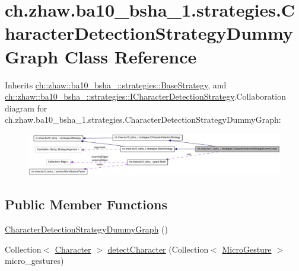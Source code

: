 \hypertarget{classch_1_1zhaw_1_1ba10__bsha__1_1_1strategies_1_1CharacterDetectionStrategyDummyGraph}{
\section{ch.zhaw.ba10\_\-bsha\_\-1.strategies.CharacterDetectionStrategyDummyGraph Class Reference}
\label{classch_1_1zhaw_1_1ba10__bsha__1_1_1strategies_1_1CharacterDetectionStrategyDummyGraph}
}


Inherits \hyperlink{classch_1_1zhaw_1_1ba10__bsha__1_1_1strategies_1_1BaseStrategy}{ch::zhaw::ba10\_\-bsha\_::strategies::BaseStrategy}, and \hyperlink{interfacech_1_1zhaw_1_1ba10__bsha__1_1_1strategies_1_1ICharacterDetectionStrategy}{ch::zhaw::ba10\_\-bsha\_::strategies::ICharacterDetectionStrategy}.Collaboration diagram for ch.zhaw.ba10\_\-bsha\_\-1.strategies.CharacterDetectionStrategyDummyGraph:\nopagebreak
\begin{figure}[H]
\begin{center}
\leavevmode
\includegraphics[width=400pt]{classch_1_1zhaw_1_1ba10__bsha__1_1_1strategies_1_1CharacterDetectionStrategyDummyGraph__coll__graph}
\end{center}
\end{figure}
\subsection*{Public Member Functions}
\begin{DoxyCompactItemize}
\item 
\hyperlink{classch_1_1zhaw_1_1ba10__bsha__1_1_1strategies_1_1CharacterDetectionStrategyDummyGraph_ac895001a14e7fe390464f49a94ddd340}{CharacterDetectionStrategyDummyGraph} ()
\item 
Collection$<$ \hyperlink{classch_1_1zhaw_1_1ba10__bsha__1_1_1Character}{Character} $>$ \hyperlink{classch_1_1zhaw_1_1ba10__bsha__1_1_1strategies_1_1CharacterDetectionStrategyDummyGraph_a6538ab532757576966ecf883ab771e32}{detectCharacter} (Collection$<$ \hyperlink{classch_1_1zhaw_1_1ba10__bsha__1_1_1service_1_1MicroGesture}{MicroGesture} $>$ micro\_\-gestures)
\end{DoxyCompactItemize}
